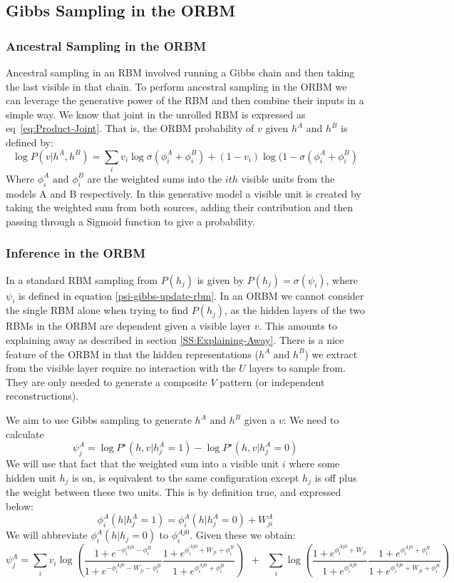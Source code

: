 \subsection{Gibbs Sampling  in the ORBM}

\subsubsection{Ancestral Sampling in the ORBM}

Ancestral sampling in an RBM involved running a Gibbs chain and then taking the last visible in that chain. To perform ancestral sampling in the ORBM we can leverage the generative power of the RBM and then combine their inputs in a simple way.
We know that joint in the unrolled RBM is expressed as eq~\ref{eq:Product-Joint}.
That is, the ORBM probability of $v$ given $h^{A} $ and $h^{B}$ is defined by:
$$ \log P(v|h^A,h^B) = \sum_i v_i \log \sigma (\phi^A_i + \phi^B_i) + (1-v_i) \log (1 - \sigma(\phi^A_i + \phi^B_i)$$
Where $\phi_i^A \text{ and } \phi_i^B $ are the weighted sums into the $ ith$ visible units from the models A and B respectively. In this generative model a visible unit is created by taking the weighted sum from both sources, adding their contribution and then passing through a Sigmoid function to give a probability.

\subsubsection{Inference in the ORBM}

In a standard RBM sampling from $P(h_j)$ is given by $P(h_j) = \sigma(\psi_i)$, where $\psi_i$ is defined in equation \ref{psi-gibbs-update-rbm}. In an ORBM we cannot consider the single RBM alone when trying to find $P(h_j)$, as the hidden layers of the two RBMs in the ORBM are dependent given a visible layer $v$. This amounts to explaining away as described in section \ref{SS:Explaining-Away}. There is a nice feature of the ORBM in that the hidden representations ($ h^A \text{ and } h^B $) we extract from the visible layer require no interaction with the $U$ layers to sample from. They are only needed to generate a composite $V$ pattern (or independent reconstructions).

We aim to use Gibbs sampling to generate $ h^A \text{ and } h^B $ given a $ v $:
We need to calculate
$$
\psi^A_j = \log P^\star(h,v | h^A_j = 1) - \log P^\star (h,v| h^A_j = 0)
$$
We will use that fact that the weighted sum into a visible unit $i$ where some hidden unit $h_j$ is on, is equivalent to the same configuration except $h_j$ is off plus the weight between these two units. This is by definition true, and expressed below:
$$
\phi^A_i(h | h^A_j=1) = \phi^A_i(h | h^A_j=0) + W^A_{ji}
$$
We will abbreviate $\phi^A_i(h | h_j=0)$ to $\phi^{Aj0}_i$. Given these we obtain:
$$
\psi^A_j = \sum_i v_i \log \left( \frac{1+ e^{-\phi^{Aj0}_i - \phi^B_i}}{1+e^{-\phi^{Aj0}_i - W_{ji} -\phi^B_i}} \frac{1+ e^{\phi^{Aj0}_i + W_{ji} + \phi^B_i}}{1+e^{\phi_i^{Aj0} + \phi^B_i}}\right) \;\;+ \;\;\sum_i \log \left(\frac{1+e^{\phi_i^{Aj0} + W_{ji}}}{1+ e^{\phi_i^{Aj0}}}
\frac{1+e^{\phi_i^{Aj0} + \phi^B_i}}{1+ e^{\phi_i^{Aj0} + W_{ji} + \phi^B_i}} \right)
$$

